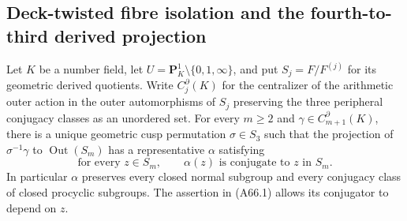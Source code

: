 \subsection{Deck-twisted fibre isolation and the fourth-to-third derived projection}

\begin{proposition}\label{A:one-layer-class-preservation}
Let $K$ be a number field, let
$U=\mathbf P^1_K\setminus\{0,1,\infty\}$, and put
$S_j=F/F^{(j)}$ for its geometric derived quotients.
Write $C_j^\partial(K)$ for the centralizer of the
arithmetic outer action in the outer automorphisms of
$S_j$ preserving the three peripheral conjugacy classes
as an unordered set. For every $m\geq2$ and
$\gamma\in C_{m+1}^\partial(K)$, there is a unique
geometric cusp permutation $\sigma\in S_3$ such that
the projection of $\sigma^{-1}\gamma$ to
$\operatorname{Out}(S_m)$ has a representative
$\alpha$ satisfying
\[
 \text{for every }z\in S_m,\qquad
             \alpha(z)\text{ is conjugate to }z
             \text{ in }S_m.                         \tag{A66.1}
\]
In particular $\alpha$ preserves every closed normal
subgroup and every conjugacy class of closed procyclic
subgroups. The assertion in (A66.1) allows its conjugator
to depend on $z$.
\end{proposition}
